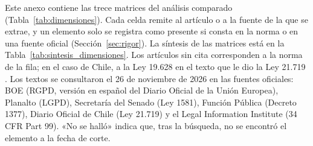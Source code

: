 \label{anx:matrices}

Este anexo contiene las trece matrices del análisis comparado (Tabla~\ref{tab:dimensiones}). Cada celda remite al artículo o a la fuente de la que se extrae, y un elemento solo se registra como presente si consta en la norma o en una fuente oficial (Sección~\ref{sec:rigor}). La síntesis de las matrices está en la Tabla~\ref{tab:sintesis_dimensiones}. Los artículos sin cita corresponden a la norma de la fila; en el caso de Chile, a la Ley 19.628 en el texto que le dio la Ley 21.719 \cite{chile2024ley21719}. Los textos se consultaron el 26 de noviembre de 2026 en las fuentes oficiales: BOE (RGPD, versión en español del Diario Oficial de la Unión Europea), Planalto (LGPD), Secretaría del Senado (Ley 1581), Función Pública (Decreto 1377), Diario Oficial de Chile (Ley 21.719) y el Legal Information Institute (34 CFR Part 99). «No se halló» indica que, tras la búsqueda, no se encontró el elemento a la fecha de corte.

